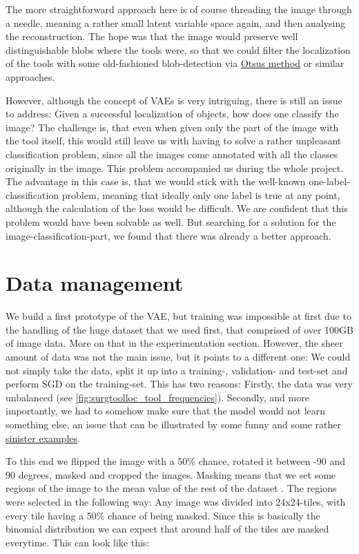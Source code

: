 The more straightforward approach here is of course threading the image through a needle, meaning a rather small latent variable space again, and then analysing the reconstruction. The hope was that the image would preserve well distinguishable blobs where the tools were, so that we could filter the localization of the tools with some old-fashioned blob-detection via \href{https://en.wikipedia.org/wiki/Otsu%27s_method}{Otsus method} or similar approaches.

However, although the concept of VAEs is very intriguing, there is still an issue to address: Given a successful localization of objects, how does one classify the image?
The challenge is, that even when given only the part of the image with the tool itself, this would still leave us with having to solve a rather unpleasant classification problem, since all the images come annotated with all the classes originally in the image. This problem accompanied us during the whole project. The advantage in this case is, that we would stick with the well-known one-label-classification problem, meaning that ideally only one label is true at any point, although the calculation of the loss would be difficult. We are confident that this problem would have been solvable as well. But searching for a solution for the image-classification-part, we found that there was already a better approach.

\section{Data management}

We build a first prototype of the VAE, but training was impossible at first due to the handling of the huge dataset that we used first, that comprised of over 100GB of image data. More on that in the experimentation section. However, the sheer amount of data was not the main issue, but it points to a different one: We could not simply take the data, split it up into a training-, validation- and test-set and perform SGD on the training-set. 
This has two reasons: Firstly, the data was very unbalanced (see \ref{fig:surgtoolloc_tool_frequencies}). Secondly, and more importantly, we had to somehow make sure that the model would not learn something else, an issue that can be illustrated by some funny and some rather \href{https://www.forbes.com/sites/korihale/2021/09/02/ai-bias-caused-80-of-black-mortgage-applicants-to-be-denied/}{sinister examples}.

To this end we flipped the image with a 50\% chance, rotated it between -90 and 90 degrees, masked and cropped the images. Masking means that we set some regions of the image to the mean value of the rest of the dataset \citep{hideandseek}. The regions were selected in the following way: Any image was divided into 24x24-tiles, with every tile having a 50\% chance of being masked. Since this is basically the binomial distribution we can expect that around half of the tiles are masked everytime. This can look like this:

